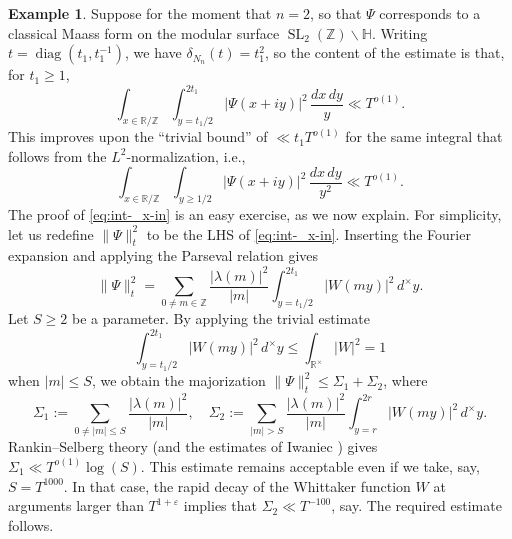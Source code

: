\documentclass[reqno]{amsart}
\DeclareMathOperator{\SL}{SL}
\def\eps{\varepsilon}
\DeclareMathOperator{\diag}{diag}
\theoremstyle{plain} \newtheorem{theorem} {Theorem}
\theoremstyle{definition} \newtheorem{definition} [theorem] {Definition}
\newtheorem{example} [theorem] {Example}
\theoremstyle{itplain} %
\numberwithin{equation}{section}
\numberwithin{theorem}{section}
\renewcommand{\geq}{\geqslant}
\renewcommand{\leq}{\leqslant}
\begin{document}
\begin{example}\label{example:growth-bound-sl2-cusp}
  Suppose for the moment that $n = 2$, so that $\Psi$ corresponds to a classical Maass form on the modular surface $\SL_2(\mathbb{Z}) \backslash \mathbb{H}$.  Writing  $t = \diag(t_1, t_1^{-1})$, we have $\delta_{N_n}(t) = t_1^2$, so the content of the estimate is that, for $t_1 \geq 1$,
  \begin{equation}\label{eq:int-_x-in}
    \int _{x \in \mathbb{R} / \mathbb{Z} }
    \int _{y = t_1/2}^{2 t_1}
    |\Psi(x + i y)|^2 \, \frac{d x \, d y}{y}
    \ll T^{o(1)}.
  \end{equation}
  This improves upon the ``trivial bound'' of $\ll t_1 T^{o(1)}$ for the same integral that follows from the $L^2$-normalization, i.e.,
    \begin{equation*}
    \int _{x \in \mathbb{R} / \mathbb{Z} }
    \int _{y \geq 1/2}
    |\Psi(x + i y)|^2 \, \frac{d x \, d y}{y^2}
    \ll T^{o(1)}.
  \end{equation*}
  The proof of \eqref{eq:int-_x-in} is an easy exercise, as we now explain.  For simplicity, let us redefine $\|\Psi \|_t^2$ to be the LHS of
   \eqref{eq:int-_x-in}.  Inserting the Fourier expansion and applying the Parseval relation gives
   \begin{equation*}
     \|\Psi \|_t^2
     =
    \sum _{0 \neq m \in \mathbb{Z} }
    \frac{|\lambda(m)|^2}{|m|}
    \int _{y = t_1/2}^{2 t_1} |W(m y)|^2 \, d^\times y.
  \end{equation*}
  Let $S \geq 2$ be a parameter.  By applying the trivial estimate
  \begin{equation*}
\int_{y=t_1/2}^{2 t_1} |W(m y)|^2 \, d^\times y \leq \int_{\mathbb{R}^\times} |W|^2 = 1
\end{equation*}
when $|m| \leq S$, we obtain the majorization $\|\Psi \|_t^2 \leq \Sigma_1 + \Sigma_2$, where
  \begin{equation*}
    \Sigma_1 :=  \sum _{0 \neq |m| \leq S}
  \frac{|\lambda(m)|^2}{|m|},
  \quad
  \Sigma_2 :=
    \sum _{|m| > S}
  \frac{|\lambda(m)|^2}{|m|}
  \int _{y = r}^{2 r} |W(m y)|^2 \, d^\times y.
\end{equation*}
Rankin--Selberg theory (and the estimates of Iwaniec \cite{MR1067982}) gives $\Sigma_1 \ll T^{o(1)} \log(S)$.  This estimate remains acceptable even if we take, say, $S = T^{1000}$.  In that case, the rapid decay of the Whittaker function $W$ at arguments larger than $T^{1+\eps}$ implies that $\Sigma_2 \ll T^{-100}$, say.  The required estimate follows.
\end{example}
\end{document}
